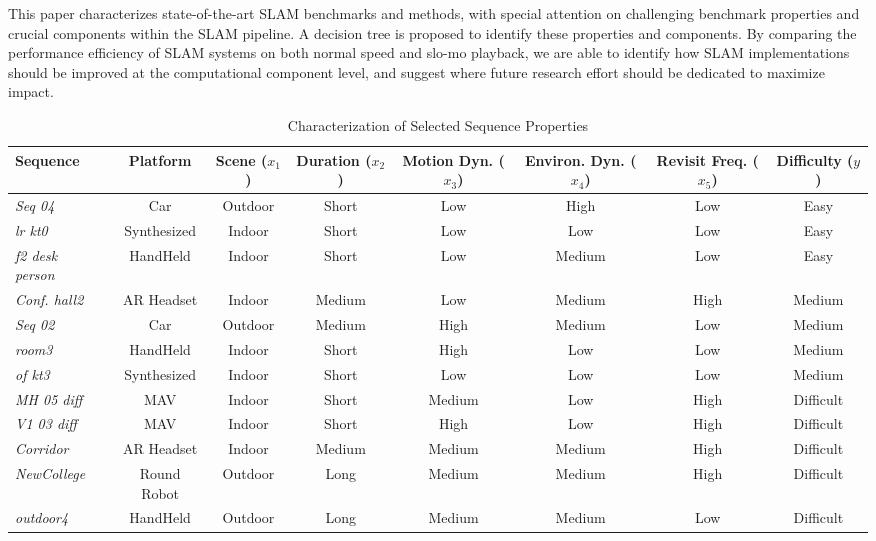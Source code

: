 This paper characterizes state-of-the-art SLAM benchmarks 
and methods, with special attention on challenging 
benchmark properties and crucial components 
within the SLAM pipeline.  A decision tree is proposed 
to identify these properties and components.  By comparing the performance efficiency 
of SLAM systems on both normal speed and slo-mo playback, we are able 
to identify how SLAM implementations should be improved at the 
computational component level, and suggest where future research effort
should be dedicated to maximize impact.
\begin{table}[t]
\centering
\caption{Characterization of Selected Sequence Properties}
\begin{tabular}{l|c|c|c|c|c|c|c}
\toprule
\midrule
\textbf{Sequence} & \textbf{Platform} & \textbf{Scene ($x_1$)} & \textbf{Duration ($x_2$)} & \textbf{Motion Dyn. ($x_3$)} & \textbf{Environ. Dyn. ($x_4$)} & \textbf{Revisit Freq. ($x_5$)} & \textbf{Difficulty ($y$)} \\
\midrule[0.1pt]
\textit{Seq 04}~\cite{KITTI} & Car & Outdoor & Short & Low & High & Low & Easy \\
\midrule[0.1pt]
\textit{lr kt0}~\cite{ICLNUIM} & Synthesized & Indoor & Short & Low & Low & Low & Easy \\
\midrule[0.1pt]
\textit{f2 desk person}~\cite{sturm12iros_ws} & HandHeld & Indoor & Short & Low & Medium & Low & Easy \\
\midrule[0.1pt]


\textit{Conf. hall2} & AR Headset & Indoor & Medium & Low & Medium & High & Medium \\
\midrule[0.1pt]
\textit{Seq 02}~\cite{KITTI} & Car & Outdoor & Medium & High & Medium & Low & Medium \\
\midrule[0.1pt]
\textit{room3}~\cite{schubert2018vidataset} & HandHeld & Indoor & Short & High & Low & Low & Medium \\
\midrule[0.1pt]
\textit{of kt3}~\cite{ICLNUIM} & Synthesized & Indoor & Short & Low & Low & Low & Medium \\
\midrule[0.1pt]


\textit{MH 05 diff}~\cite{burri2016euroc} & MAV & Indoor & Short & Medium & Low & High & Difficult \\
\midrule[0.1pt]
\textit{V1 03 diff}~\cite{burri2016euroc} & MAV & Indoor & Short & High & Low & High & Difficult \\
\midrule[0.1pt]
\textit{Corridor} & AR Headset & Indoor & Medium & Medium & Medium & High & Difficult \\
\midrule[0.1pt]
\textit{NewCollege}~\cite{smith2009new} & Round Robot & Outdoor & Long & Medium & Medium & High & Difficult \\
\midrule[0.1pt]
\textit{outdoor4}~\cite{schubert2018vidataset} & HandHeld & Outdoor & Long & Medium & Medium & Low & Difficult \\
\midrule[0.1pt]
\bottomrule
\end{tabular} 
\label{tab:summ_vslam}
\end{table}



